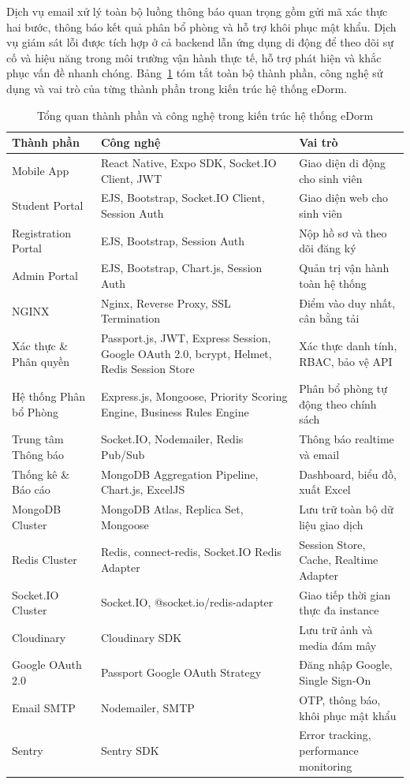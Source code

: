 \documentclass[../DoAn.tex]{subfiles}
\begin{document}
Dịch vụ email xử lý toàn bộ luồng thông báo quan trọng gồm gửi mã xác thực
hai bước, thông báo kết quả phân bổ phòng và hỗ trợ khôi phục mật khẩu. Dịch vụ
giám sát lỗi được tích hợp ở cả backend lẫn ứng dụng di động để theo dõi sự cố
và hiệu năng trong môi trường vận hành thực tế, hỗ trợ phát hiện và khắc phục
vấn đề nhanh chóng. Bảng~\ref{tab:component_overview} tóm tắt toàn bộ thành
phần, công nghệ sử dụng và vai trò của từng thành phần trong kiến trúc hệ thống
eDorm.

\begin{table}[H]
\centering
\caption{Tổng quan thành phần và công nghệ trong kiến trúc hệ thống eDorm}
\label{tab:component_overview}
\small
\begin{tabular}{|p{3.4cm}|p{4.8cm}|p{4.4cm}|}
\hline
\textbf{Thành phần} & \textbf{Công nghệ} & \textbf{Vai trò} \\
\hline
Mobile App
  & React Native, Expo SDK, Socket.IO Client, JWT
  & Giao diện di động cho sinh viên \\
\hline
Student Portal
  & EJS, Bootstrap, Socket.IO Client, Session Auth
  & Giao diện web cho sinh viên \\
\hline
Registration Portal
  & EJS, Bootstrap, Session Auth
  & Nộp hồ sơ và theo dõi đăng ký \\
\hline
Admin Portal
  & EJS, Bootstrap, Chart.js, Session Auth
  & Quản trị vận hành toàn hệ thống \\
\hline
NGINX
  & Nginx, Reverse Proxy, SSL Termination
  & Điểm vào duy nhất, cân bằng tải \\
\hline
Xác thực \& Phân quyền
  & Passport.js, JWT, Express Session, Google OAuth 2.0, bcrypt, Helmet, Redis Session Store
  & Xác thực danh tính, RBAC, bảo vệ API \\
\hline
Hệ thống Phân bổ Phòng
  & Express.js, Mongoose, Priority Scoring Engine, Business Rules Engine
  & Phân bổ phòng tự động theo chính sách \\
\hline
Trung tâm Thông báo
  & Socket.IO, Nodemailer, Redis Pub/Sub
  & Thông báo realtime và email \\
\hline
Thống kê \& Báo cáo
  & MongoDB Aggregation Pipeline, Chart.js, ExcelJS
  & Dashboard, biểu đồ, xuất Excel \\
\hline
MongoDB Cluster
  & MongoDB Atlas, Replica Set, Mongoose
  & Lưu trữ toàn bộ dữ liệu giao dịch \\
\hline
Redis Cluster
  & Redis, connect-redis, Socket.IO Redis Adapter
  & Session Store, Cache, Realtime Adapter \\
\hline
Socket.IO Cluster
  & Socket.IO, @socket.io/redis-adapter
  & Giao tiếp thời gian thực đa instance \\
\hline
Cloudinary
  & Cloudinary SDK
  & Lưu trữ ảnh và media đám mây \\
\hline
Google OAuth 2.0
  & Passport Google OAuth Strategy
  & Đăng nhập Google, Single Sign-On \\
\hline
Email SMTP
  & Nodemailer, SMTP
  & OTP, thông báo, khôi phục mật khẩu \\
\hline
Sentry
  & Sentry SDK
  & Error tracking, performance monitoring \\
\hline
\end{tabular}
\end{table}
\end{document}
